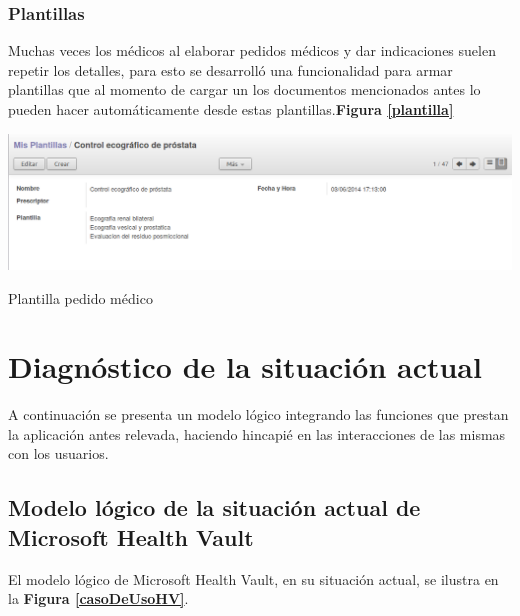 {\correccionTexto
\subsubsection{Plantillas}
Muchas veces los médicos al elaborar pedidos médicos y dar indicaciones suelen repetir los detalles, para esto se desarrolló una funcionalidad para armar plantillas que al momento de cargar un los documentos mencionados antes lo pueden hacer automáticamente desde estas plantillas.\textbf{Figura \ref{plantilla}}
}

\begin{correccionFigure}[h]
      \centering
      \includegraphics[width=.8\textwidth]{img/tp1/HE/PlantillaPM}
      \caption{Plantilla pedido médico}
      \label{plantilla}
\end{correccionFigure}

\section{Diagnóstico de la situación actual}
A continuación se presenta un modelo lógico integrando las funciones que prestan la aplicación antes relevada, haciendo hincapié en las interacciones de las mismas con los usuarios.


\subsection{Modelo lógico de la situación actual de Microsoft Health Vault}

El modelo lógico de Microsoft Health Vault, en su situación actual, se ilustra en la \textbf{Figura \ref{casoDeUsoHV}}.


